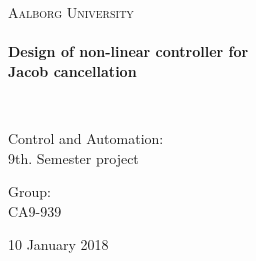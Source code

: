 %

\thispagestyle{empty}

\begin{center}

\vspace*{\fill}

\textsc{\LARGE Aalborg University}\\[1.0cm]

\HRule \\[0.4cm]
{ \HUGE \bfseries Design of non-linear controller for \\ Jacob cancellation%
\\[0.5cm] } %

\HRule \\[1.5cm]%


\begin{minipage}{0.4\textwidth}
\begin{flushleft} \large
Control and Automation:\\
9th. Semester project
\end{flushleft}
\end{minipage}
\begin{minipage}{0.4\textwidth}
\begin{flushright} \large
Group: \\
CA9-939
\end{flushright}
\end{minipage}

\vspace*{\fill}


{\large 10 January 2018}

\end{center}
